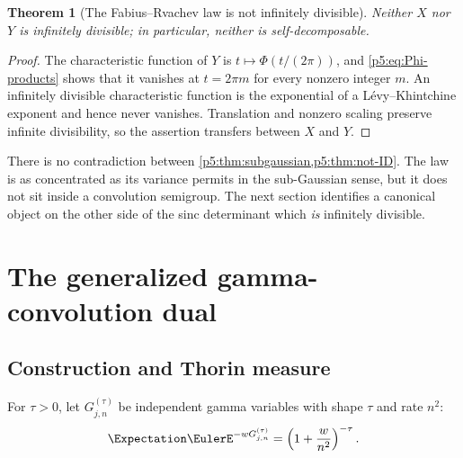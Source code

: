 \documentclass[11pt]{article}
\numberwithin{equation}{section}
\newtheorem{theorem}{Theorem}[section]
\theoremstyle{definition}
\theoremstyle{remark}
\begin{document}
\begin{theorem}[The Fabius--Rvachev law is not infinitely divisible]
\label{p5:thm:not-ID}
Neither $X$ nor $Y$ is infinitely divisible; in particular, neither is
self-decomposable.
\end{theorem}

\begin{proof}
The characteristic function of $Y$ is
$t\mapsto\Phi(t/(2\pi))$, and \cref{p5:eq:Phi-products} shows that it vanishes at
$t=2\pi m$ for every nonzero integer $m$.  An infinitely divisible
characteristic function is the exponential of a L\'evy--Khintchine exponent
and hence never vanishes.  Translation and nonzero scaling preserve infinite
divisibility, so the assertion transfers between $X$ and $Y$.
\end{proof}

\begin{boxedremark}
There is no contradiction between \cref{p5:thm:subgaussian,p5:thm:not-ID}.  The law
is as concentrated as its variance permits in the sub-Gaussian sense, but it
does not sit inside a convolution semigroup.  The next section identifies a
canonical object on the other side of the sinc determinant which \emph{is}
infinitely divisible.
\end{boxedremark}

\section{The generalized gamma-convolution dual}

\subsection{Construction and Thorin measure}

For $\tau>0$, let $G_{j,n}^{(\tau)}$ be independent gamma variables with shape
$\tau$ and rate $n^2$:
\begin{equation}\label{p5:eq:gamma-LT}
 \Expectation\EulerE^{-wG_{j,n}^{(\tau)}}=\left(1+\frac{w}{n^2}\right)^{-\tau}.
\end{equation}
\end{document}
